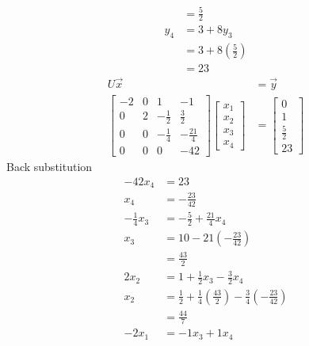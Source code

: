 \documentclass[12pt, letterpaper]{article}
\begin{document}
\begin{enumerate}
\begin{enumerate}[(a)]
\begin{align*}
                    &= \frac52 \\
                y_4 &= 3 + 8 y_3 \\
                    &= 3 + 8(\frac52) \\
                    &= 23
            \end{align*}
            \begin{align*}
                U\vec x &= \vec y \\
                \begin{bmatrix}
                    -2 & 0 & 1 &-1 \\
                    0 & 2 & -\frac12 & \frac32 \\
                    0 & 0 & -\frac14 &-\frac{21}4 \\
                    0 & 0 & 0 & -42
                \end{bmatrix} 
                \begin{bmatrix}
                        x_1 \\
                        x_2 \\
                        x_3 \\
                        x_4
                \end{bmatrix}
                &= 
                \begin{bmatrix}
                        0 \\
                        1 \\
                        \frac 52 \\
                        23
                \end{bmatrix}
            \end{align*}
            Back substitution
            \begin{align*}
                -42x_4 &= 23 \\
                x_4 &= -\frac{23}{42} \\
                -\frac14 x_3 &= - \frac52 + \frac{21}4 x_4 \\
                x_3 &= 10 - 21(-\frac{23}{42}) \\
                    &= \frac{43}{2} \\
                2x_2 &= 1 + \frac12 x_3 - \frac32 x_4 \\
                x_2 &= \frac12 + \frac14(\frac{43}{2}) - \frac34(-\frac{23}{42}) \\
                    &= \frac{44}7 \\
                -2x_1 &= -1 x_3 + 1 x_4 \\

\end{align*}
\end{enumerate}
\end{enumerate}
\end{document}
